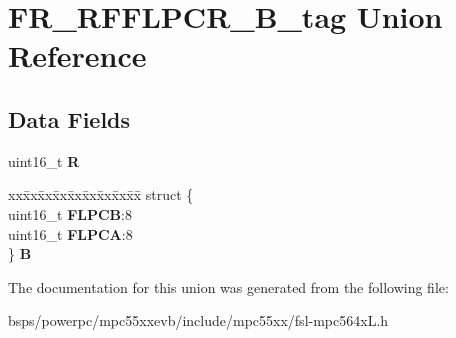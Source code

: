 \hypertarget{unionFR__RFFLPCR__16B__tag}{}\section{F\+R\+\_\+\+R\+F\+F\+L\+P\+C\+R\+\_\+B\+\_\+tag Union Reference}
\label{unionFR__RFFLPCR__16B__tag}
\subsection*{Data Fields}
\begin{DoxyCompactItemize}
\item 
\mbox{\label{unionFR__RFFLPCR__16B__tag_a64c8cf6cd16317f9520b4eb7ac3b7d03}} 
uint16\+\_\+t {\bfseries R}
\item 
\mbox{\label{unionFR__RFFLPCR__16B__tag_a2ffa9ca8ecc929caa0a33a409d085539}} 
\begin{tabbing}
xx\=xx\=xx\=xx\=xx\=xx\=xx\=xx\=xx\=\kill
struct \{\\
\>uint16\_t {\bfseries FLPCB}:8\\
\>uint16\_t {\bfseries FLPCA}:8\\
\} {\bfseries B}\\

\end{tabbing}\end{DoxyCompactItemize}


The documentation for this union was generated from the following file\+:\begin{DoxyCompactItemize}
\item 
bsps/powerpc/mpc55xxevb/include/mpc55xx/fsl-\/mpc564x\+L.\+h\end{DoxyCompactItemize}
